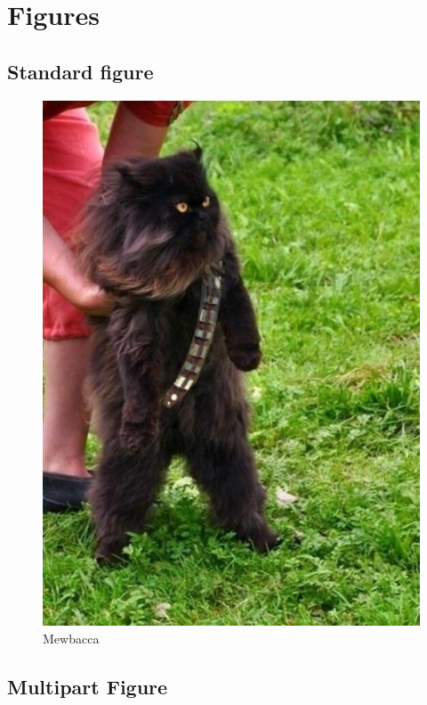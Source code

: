 \documentclass[12pt,a4paper]{article}
\begin{document}
    \clearpage

\section{Figures}
    \subsection{Standard figure}

    \begin{figure}[ht!]
      \centering
      \includegraphics[width=.5\textwidth]{mewbacca.jpg}
      \caption{Mewbacca \label{fig:mewbacca}}
    \end{figure}
   

    \subsection{Multipart Figure}

\end{document}
